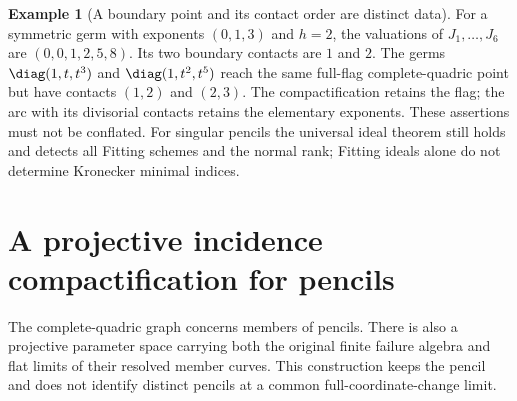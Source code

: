 \documentclass[11pt,reqno]{amsart}
\numberwithin{equation}{section}
\theoremstyle{definition}\newtheorem{definition}[theorem]{Definition}
\newtheorem{example}[theorem]{Example}
\theoremstyle{remark}\newtheorem{remark}[theorem]{Remark}
\begin{document}
\begin{example}[A boundary point and its contact order are distinct data]
\label{ex:contact-profile-v157}
For a symmetric germ with exponents $(0,1,3)$ and $h=2$, the valuations
of $J_1,\ldots,J_6$ are $(0,0,1,2,5,8)$.
Its two boundary contacts are $1$ and $2$. The germs
$\diag(1,t,t^3)$ and $\diag(1,t^2,t^5)$ reach the same full-flag
complete-quadric point but have contacts $(1,2)$ and $(2,3)$.
The compactification retains the flag; the arc with its divisorial
contacts retains the elementary exponents. These assertions must not
be conflated. For singular pencils the universal ideal theorem still
holds and detects all Fitting schemes and the normal rank; Fitting
ideals alone do not determine Kronecker minimal indices.
\end{example}

\section{A projective incidence compactification for pencils}
\label{sec:pencil-compactification-v157}
The complete-quadric graph concerns members of pencils. There is also
a projective parameter space carrying both the original finite failure
algebra and flat limits of their resolved member curves. This construction
keeps the pencil and does not identify distinct pencils at a common
full-coordinate-change limit.
\end{document}
